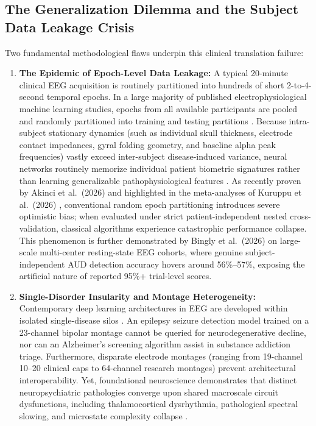 \documentclass[11pt,a4paper]{article}
\begin{document}
\subsection{The Generalization Dilemma and the Subject Data Leakage Crisis}
Two fundamental methodological flaws underpin this clinical translation failure:
\begin{enumerate}
    \item \textbf{The Epidemic of Epoch-Level Data Leakage:} A typical 20-minute clinical EEG acquisition is routinely partitioned into hundreds of short 2-to-4-second temporal epochs. In a large majority of published electrophysiological machine learning studies, epochs from all available participants are pooled and randomly partitioned into training and testing partitions \cite{saeb2017,yassin2022}. Because intra-subject stationary dynamics (such as individual skull thickness, electrode contact impedances, gyral folding geometry, and baseline alpha peak frequencies) vastly exceed inter-subject disease-induced variance, neural networks routinely memorize individual patient biometric signatures rather than learning generalizable pathophysiological features \cite{craik2019,lioi2020}. As recently proven by Akinci et al.\ (2026) \cite{akinci2026} and highlighted in the meta-analyses of Kuruppu et al.\ (2026) \cite{kuruppu2026}, conventional random epoch partitioning introduces severe optimistic bias; when evaluated under strict patient-independent nested cross-validation, classical algorithms experience catastrophic performance collapse. This phenomenon is further demonstrated by Bingly et al.\ (2026) \cite{bingly2026coga} on large-scale multi-center resting-state EEG cohorts, where genuine subject-independent AUD detection accuracy hovers around 56\%--57\%, exposing the artificial nature of reported 95\%+ trial-level scores.
    \item \textbf{Single-Disorder Insularity and Montage Heterogeneity:} Contemporary deep learning architectures in EEG are developed within isolated single-disease silos \cite{nguyen2026deeptokeneeg,tanveer2026gramdiff,hariharan2026eegfuseformer}. An epilepsy seizure detection model trained on a 23-channel bipolar montage cannot be queried for neurodegenerative decline, nor can an Alzheimer's screening algorithm assist in substance addiction triage. Furthermore, disparate electrode montages (ranging from 19-channel 10--20 clinical caps to 64-channel research montages) prevent architectural interoperability. Yet, foundational neuroscience demonstrates that distinct neuropsychiatric pathologies converge upon shared macroscale circuit dysfunctions, including thalamocortical dysrhythmia, pathological spectral slowing, and microstate complexity collapse \cite{zhang2021,llinas1999,rangaswamy2008}.
\end{enumerate}
\end{document}
